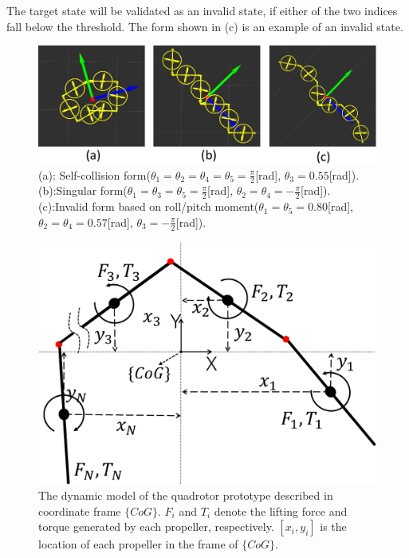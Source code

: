 \par
The target state will be validated as an invalid state, if either of the two indices fall below the threshold. The form shown in (c) is an example of an invalid state.

\begin{figure}[t]
  \begin{center}
    \includegraphics[width=1.0\columnwidth]{figs/invalid_forms.pdf}
  \end{center}
  \caption{(a): Self-collision form($\theta_1=\theta_2=\theta_4=\theta_5=\frac{\pi}{2}$[rad], $\theta_3=0.55$[rad]). (b):Singular form($\theta_1=\theta_3=\theta_5=\frac{\pi}{2}$[rad], $\theta_2=\theta_4=-\frac{\pi}{2}$[rad]). (c):Invalid form based on roll/pitch moment($\theta_1=\theta_5=0.80$[rad], $\theta_2=\theta_4=0.57$[rad], $\theta_3=-\frac{\pi}{2}$[rad]).\label{figure:invalid_forms}}
\end{figure}

\begin{figure}[t]
  \begin{center}
    \includegraphics[width=0.9\columnwidth]{figs/dynamic_model.pdf}
    \caption{The dynamic model of the quadrotor prototype described in coordinate frame $\{CoG\}$. $F_i$ and $T_i$ denote the lifting force and torque generated by each propeller, respectively. $[x_i, y_i]$ is the location of each propeller in the frame of $\{CoG\}$.\label{figure:dynamic_model}}
  \end{center}
\end{figure}

